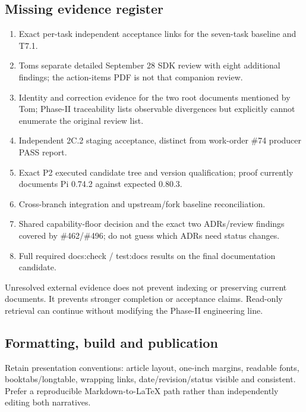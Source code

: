 \documentclass[
  11pt,
]{article}
\providecommand{\tightlist}{%
  \setlength{\itemsep}{0pt}\setlength{\parskip}{0pt}}
\begin{document}
\hypertarget{missing-evidence-register}{%
\subsection{Missing evidence register}\label{missing-evidence-register}}

\begin{enumerate}
\def\labelenumi{\arabic{enumi}.}
\tightlist
\item
  Exact per-task independent acceptance links for the seven-task
  baseline and T7.1.
\item
  Tom\textquotesingle s separate detailed September 28 SDK review with
  eight additional findings; the action-items PDF is not that companion
  review.
\item
  Identity and correction evidence for the two root documents mentioned
  by Tom; Phase-II traceability lists observable divergences but
  explicitly cannot enumerate the original review list.
\item
  Independent 2C.2 staging acceptance, distinct from work-order \#74
  producer PASS report.
\item
  Exact P2 executed candidate tree and version qualification; proof
  currently documents Pi 0.74.2 against expected 0.80.3.
\item
  Cross-branch integration and upstream/fork baseline reconciliation.
\item
  Shared capability-floor decision and the exact two ADRs/review
  findings covered by \#462/\#496; do not guess which ADRs need status
  changes.
\item
  Full required docs:check / test:docs results on the final
  documentation candidate.
\end{enumerate}

Unresolved external evidence does not prevent indexing or preserving
current documents. It prevents stronger completion or acceptance claims.
Read-only retrieval can continue without modifying the Phase-II
engineering line.

\hypertarget{formatting-build-and-publication}{%
\subsection{Formatting, build and
publication}\label{formatting-build-and-publication}}

Retain presentation conventions: article layout, one-inch margins,
readable fonts, booktabs/longtable, wrapping links, date/revision/status
visible and consistent. Prefer a reproducible Markdown-to-LaTeX path
rather than independently editing both narratives.
\end{document}
